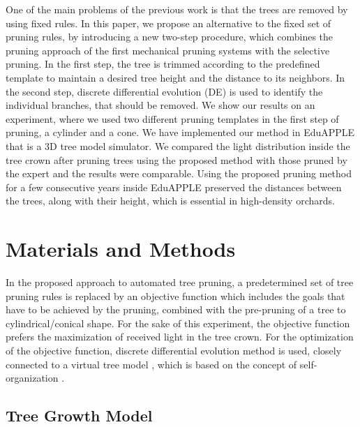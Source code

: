 \documentclass[1p]{elsarticle}
\begin{document}
One of the main problems of the previous work is that the trees are
removed by using fixed rules. In this paper, we propose an alternative
to the fixed set of pruning rules, by introducing a new two-step
procedure, which combines the pruning approach of the first mechanical
pruning systems with the selective pruning. In the first step, the tree
is trimmed according to the predefined template to maintain a desired
tree height and the distance to its neighbors. In the second step,
discrete differential evolution (DE) \cite{strnad_novel_2017} is used to identify the
individual branches, that should be removed. We show our results on an
experiment, where we used two different pruning templates in the first
step of pruning, a cylinder and a cone. We have implemented our method
in EduAPPLE \cite{kohek_eduapple:_2015} that is a 3D tree model simulator. We compared the
light distribution inside the tree crown after pruning trees using the
proposed method with those pruned by the expert and the results were
comparable. Using the proposed pruning method for a few consecutive
years inside EduAPPLE preserved the distances between the trees, along
with their height, which is essential in high-density orchards.

\section{Materials and Methods}

In the proposed approach to automated tree pruning, a predetermined set
of tree pruning rules is replaced by an objective function which
includes the goals that have to be achieved by the pruning, combined
with the pre-pruning of a tree to cylindrical/conical shape. For the
sake of this experiment, the objective function prefers the maximization
of received light in the tree crown. For the optimization of the
objective function, discrete differential evolution method is used,
closely connected to a virtual tree model \cite{kohek_eduapple:_2015}, which is based on the
concept of self-organization \cite{palubicki_self-organizing_2009}.

\subsection{Tree Growth Model}
\end{document}
